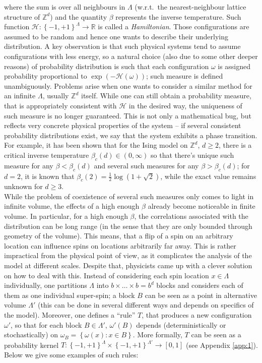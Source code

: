 \documentclass[12pt]{article}
\renewcommand{\H}{\mathcal{H}}
\newcommand{\R}{\mathbb{R}}
\newcommand{\Z}{\mathbb{Z}}
\newcommand{\set}[1]{\left\{#1\right\}}
\newcommand{\ra}{\rightarrow}
\newcommand{\1}{\mathbbm{1}}
\newcommand{\5}{\vspace{0.5cm}}
\theoremstyle{definition}
\begin{document}
where the sum is over all neighbours in $\Lambda$ (w.r.t.~the nearest-neighbour lattice structure of $\Z^d$) and the quantity $\beta$ represents the inverse temperature. Such function $\H:\set{-1,+1}^{\Lambda}\ra\R$ is called a \textit{Hamiltonian}. Those configurations are assumed to be random and hence one wants to describe their underlying distribution. A key observation is that such physical systems tend to assume configurations with less energy, so a natural choice (also due to some other deeper reasons) of probability distribution is such that each configuration $\omega$ is assigned probability proportional to $\exp(-\H(\omega))$; such measure is defined unambiguously. Problems arise when one wants to consider a similar method for an infinite $\Lambda$, usually $\Z^d$ itself. While one can still obtain a probability measure, that is appropriately consistent with $\H$ in the desired way, the uniqueness of such measure is no longer guaranteed. This is not only a mathematical bug, but reflects very concrete physical properties of the system -- if several consistent probability distributions exist, we say that the system exhibits a phase transition. For example, it has been shown that for the Ising model on $\Z^d$, $d\geq 2$, there is a critical inverse temperature $\beta_c(d)\in(0,\infty)$ so that there's unique such measure for any $\beta<\beta_c(d)$ and several such measures for any $\beta>\beta_c(d)$; for $d=2$, it is known that $\beta_c(2)=\frac{1}{2}\log(1+\sqrt{2})$, while the exact value remains unknown for $d\geq 3$. \\

While the problem of coexistence of several such measures only comes to light in infinite volume, the effects of a high enough $\beta$ already become noticeable in finite volume. In particular, for a high enough $\beta$, the correlations associated with the distribution can be long range (in the sense that they are only bounded through geometry of the volume). This means, that a flip of a spin on an arbitrary location can influence spins on locations arbitrarily far away. This is rather impractical from the physical point of view, as it complicates the analysis of the model at different scales. Despite that, physicists came up with a clever solution on how to deal with this. Instead of considering each spin location $x\in\Lambda$ individually, one partitions $\Lambda$ into $b\times\ldots\times b=b^d$ blocks and considers each of them as one individual super-spin; a block $B$ can be seen as a point in alternative volume $\Lambda'$ (this can be done in several different ways and depends on specifics of the model). Moreover, one defines a ``rule'' $T$, that produces a new configuration $\omega'$, so that for each block $B\in\Lambda'$, $\omega'(B)$ depends (deterministically or stochastically) on $\omega_B=\set{\omega(x):x\in B}$. More formally, $T$ can be seen as a probability kernel $T:\set{-1,+1}^{\Lambda}\times\set{-1,+1}^{\Lambda'}\ra[0,1]$ (see Appendix \ref{app:1}). Below we give some examples of such rules:
\end{document}
